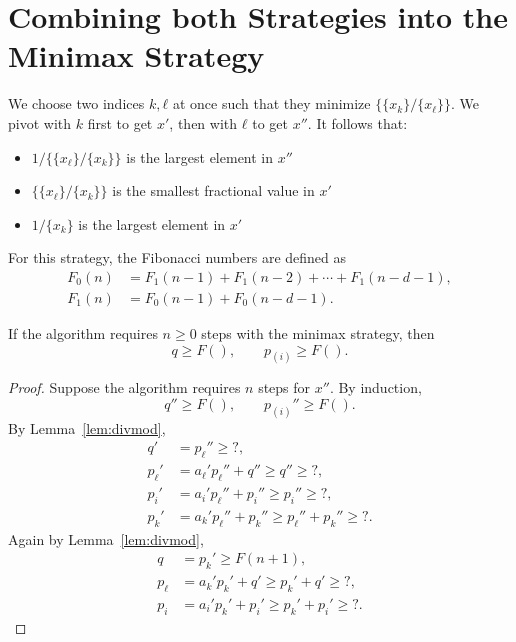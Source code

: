 \section{Combining both Strategies into the Minimax Strategy}

We choose two indices $k, ℓ$ at once such that they minimize $\{\{x_k\}/\{x_ℓ\}\}$.
We pivot with $k$ first to get $x'$, then with $ℓ$ to get $x''$.
It follows that:

\begin{itemize}
  \item $1/\{\{x_ℓ\}/\{x_k\}\}$ is the largest element in $x''$
  \item $\{\{x_ℓ\}/\{x_k\}\}$ is the smallest fractional value in $x'$
  \item $1/\{x_k\}$ is the largest element in $x'$
\end{itemize}

For this strategy, the Fibonacci numbers are defined as
\begin{align*}
  F_0(n) & = F_1(n-1) + F_1(n-2) + ⋯ + F_1(n-d-1), \\
  F_1(n) & = F_0(n-1) + F_0(n-d-1).
\end{align*}

\begin{theorem}
  If the algorithm requires $n ≥ 0$ steps with the minimax strategy,
  then
  \[
    q ≥ F(),
    \qquad
    p_{(i)} ≥ F().
  \]
\end{theorem}

\begin{proof}
  Suppose the algorithm requires $n$ steps for $x''$.
  By induction,
  \[
    q'' ≥ F(),
    \qquad
    p_{(i)}'' ≥ F().
  \]
  By Lemma~\ref{lem:divmod},
  \begin{align*}
    q' & = p_ℓ'' ≥ ?, \\
    p_ℓ' & = a_ℓ' p_ℓ'' + q'' ≥ q'' ≥ ?, \\
    p_i' & = a_i' p_ℓ'' + p_i'' ≥ p_i'' ≥ ?, \\
    p_k' & = a_k' p_ℓ'' + p_k'' ≥ p_ℓ'' + p_k'' ≥ ?.
  \end{align*}
  Again by Lemma~\ref{lem:divmod},
  \begin{align*}
    q & = p_k' ≥ F(n + 1), \\
    p_ℓ & = a_k' p_k' + q' ≥ p_k' + q' ≥ ?, \\
    p_i & = a_i' p_k' + p_i' ≥ p_k' + p_i' ≥ ?.
  \end{align*}
\end{proof}


